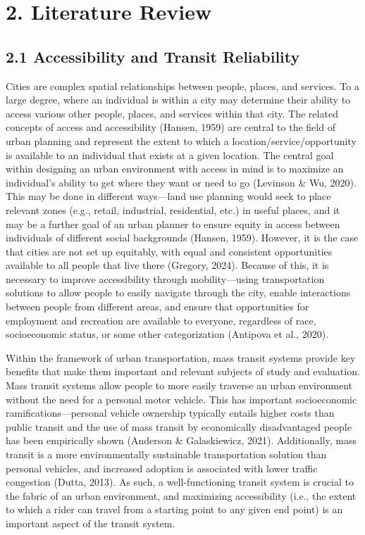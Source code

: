 \documentclass[
  12pt,
]{article}
\begin{document}
\section{2. Literature Review}\label{literature-review}

\subsection{2.1 Accessibility and Transit
Reliability}\label{accessibility-and-transit-reliability}

Cities are complex spatial relationships between people, places, and
services. To a large degree, where an individual is within a city may
determine their ability to access various other people, places, and
services within that city. The related concepts of access and
accessibility (Hansen, 1959) are central to the field of urban planning
and represent the extent to which a location/service/opportunity is
available to an individual that exists at a given location. The central
goal within designing an urban environment with access in mind is to
maximize an individual's ability to get where they want or need to go
(Levinson \& Wu, 2020). This may be done in different ways---land use
planning would seek to place relevant zones (e.g., retail, industrial,
residential, etc.) in useful places, and it may be a further goal of an
urban planner to ensure equity in access between individuals of
different social backgrounds (Hansen, 1959). However, it is the case
that cities are not set up equitably, with equal and consistent
opportunities available to all people that live there (Gregory, 2024).
Because of this, it is necessary to improve accessibility through
mobility---using transportation solutions to allow people to easily
navigate through the city, enable interactions between people from
different areas, and ensure that opportunities for employment and
recreation are available to everyone, regardless of race, socioeconomic
status, or some other categorization (Antipova et al., 2020).

Within the framework of urban transportation, mass transit systems
provide key benefits that make them important and relevant subjects of
study and evaluation. Mass transit systems allow people to more easily
traverse an urban environment without the need for a personal motor
vehicle. This has important socioeconomic ramifications---personal
vehicle ownership typically entails higher costs than public transit and
the use of mass transit by economically disadvantaged people has been
empirically shown (Anderson \& Galaskiewicz, 2021). Additionally, mass
transit is a more environmentally sustainable transportation solution
than personal vehicles, and increased adoption is associated with lower
traffic congestion (Dutta, 2013). As such, a well-functioning transit
system is crucial to the fabric of an urban environment, and maximizing
accessibility (i.e., the extent to which a rider can travel from a
starting point to any given end point) is an important aspect of the
transit system.
\end{document}
